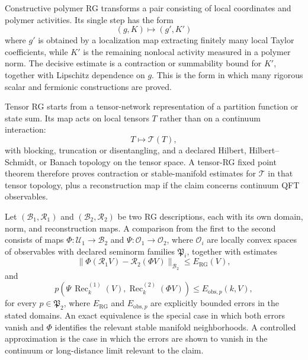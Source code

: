 Constructive polymer RG transforms a pair consisting of local coordinates and
polymer activities.  Its single step has the form
\[
  (g,K)\longmapsto (g',K')
\]
where \(g'\) is obtained by a localization map extracting finitely many local
Taylor coefficients, while \(K'\) is the remaining nonlocal activity measured
in a polymer norm.  The decisive estimate is a contraction or summability
bound for \(K'\), together with Lipschitz dependence on \(g\).  This is the
form in which many rigorous scalar and fermionic constructions are proved.

Tensor RG starts from a tensor-network representation of a partition
function or state sum.  Its map acts on local tensors \(T\) rather than on a
continuum interaction:
\begin{equation}
  T\longmapsto \mathcal T(T),
  \label{eq:tensor-rg-map-taxonomy}
\end{equation}
with blocking, truncation or disentangling, and a declared Hilbert,
Hilbert--Schmidt, or Banach topology on the tensor space.  A tensor-RG fixed
point theorem therefore proves contraction or stable-manifold estimates for
\(\mathcal T\) in that tensor topology, plus a reconstruction map if the
claim concerns continuum QFT observables.

\begin{definition}
\label{def:comparison-of-rg-descriptions}
Let \((\mathcal B_1,\mathcal R_1)\) and
\((\mathcal B_2,\mathcal R_2)\) be two RG descriptions, each with its own
domain, norm, and reconstruction maps.  A comparison from the first to the
second consists of maps \(\Phi:\mathcal U_1\to\mathcal B_2\) and
\(\Psi:\mathcal O_1\to\mathcal O_2\), where \(\mathcal O_i\) are locally
convex spaces of observables with declared seminorm families
\(\mathfrak P_i\), together with estimates
\begin{equation}
  \|\Phi(\mathcal R_1 V)-\mathcal R_2(\Phi V)\|_{\mathcal B_2}
  \leq E_{\mathrm{RG}}(V),
  \label{eq:rg-description-intertwining-error}
\end{equation}
and
\begin{equation}
  p\!\left(
    \Psi\,\operatorname{Rec}^{(1)}_k(V),
    \operatorname{Rec}^{(2)}_k(\Phi V)
  \right)
  \leq E_{\mathrm{obs},p}(k,V),
  \label{eq:rg-description-observable-error}
\end{equation}
for every \(p\in\mathfrak P_2\), where \(E_{\mathrm{RG}}\) and
\(E_{\mathrm{obs},p}\) are explicitly bounded errors in the stated domains.
An exact equivalence is the special case in which both errors vanish and
\(\Phi\) identifies the relevant stable
manifold neighborhoods.  A controlled approximation is the case in which the
errors are shown to vanish in the continuum or long-distance limit relevant
to the claim.
\end{definition}

